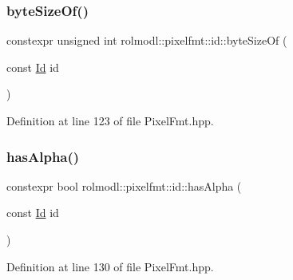 \mbox{\label{namespacerolmodl_1_1pixelfmt_1_1id_ae16c4d4a919e9299f3dd3885085dc858}} 
\subsubsection{\texorpdfstring{byteSizeOf()}{byteSizeOf()}}
{\footnotesize\ttfamily constexpr unsigned int rolmodl\+::pixelfmt\+::id\+::byte\+Size\+Of (\begin{DoxyParamCaption}\item[{const \mbox{\hyperlink{namespacerolmodl_1_1pixelfmt_a96282713e4465ba9211c8fd3a702b52b}{Id}}}]{id }\end{DoxyParamCaption})\hspace{0.3cm}{\ttfamily [noexcept]}}



Definition at line 123 of file Pixel\+Fmt.\+hpp.

\mbox{\label{namespacerolmodl_1_1pixelfmt_1_1id_adab6c8132dabf85b18b3a3442890eeba}} 
\subsubsection{\texorpdfstring{hasAlpha()}{hasAlpha()}}
{\footnotesize\ttfamily constexpr bool rolmodl\+::pixelfmt\+::id\+::has\+Alpha (\begin{DoxyParamCaption}\item[{const \mbox{\hyperlink{namespacerolmodl_1_1pixelfmt_a96282713e4465ba9211c8fd3a702b52b}{Id}}}]{id }\end{DoxyParamCaption})\hspace{0.3cm}{\ttfamily [noexcept]}}



Definition at line 130 of file Pixel\+Fmt.\+hpp.

\mbox{\label{namespacerolmodl_1_1pixelfmt_1_1id_a64b0b7234a34c6116171adebd11888e8}} 
